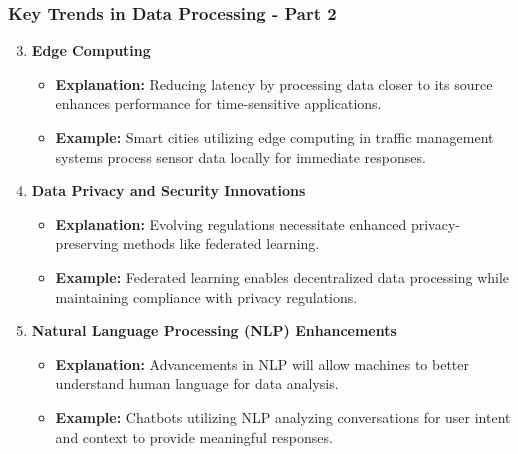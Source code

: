 \documentclass[aspectratio=169]{beamer}
\begin{document}
\begin{frame}[fragile]
    \frametitle{Key Trends in Data Processing - Part 2}
    \begin{enumerate}
        \setcounter{enumi}{2} %
        \item \textbf{Edge Computing}
            \begin{itemize}
                \item \textbf{Explanation:} Reducing latency by processing data closer to its source enhances performance for time-sensitive applications.
                \item \textbf{Example:} Smart cities utilizing edge computing in traffic management systems process sensor data locally for immediate responses.
            \end{itemize}

        \item \textbf{Data Privacy and Security Innovations}
            \begin{itemize}
                \item \textbf{Explanation:} Evolving regulations necessitate enhanced privacy-preserving methods like federated learning.
                \item \textbf{Example:} Federated learning enables decentralized data processing while maintaining compliance with privacy regulations.
            \end{itemize}

        \item \textbf{Natural Language Processing (NLP) Enhancements}
            \begin{itemize}
                \item \textbf{Explanation:} Advancements in NLP will allow machines to better understand human language for data analysis.
                \item \textbf{Example:} Chatbots utilizing NLP analyzing conversations for user intent and context to provide meaningful responses.
            \end{itemize}
    \end{enumerate}
\end{frame}
\end{document}
